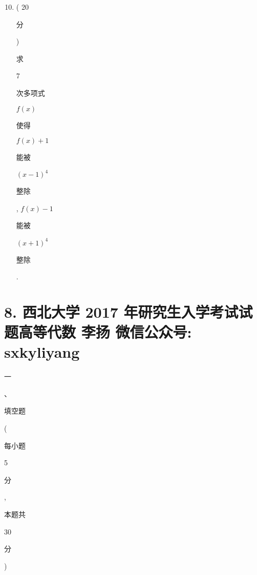 \documentclass[10pt]{article}
\begin{document}
\begin{enumerate}
  \setcounter{enumi}{9}
  \item ( 20 \begin{CJK}{UTF8}{mj}分\end{CJK}) \begin{CJK}{UTF8}{mj}求\end{CJK} 7 \begin{CJK}{UTF8}{mj}次多项式\end{CJK} $f(x)$ \begin{CJK}{UTF8}{mj}使得\end{CJK} $f(x)+1$ \begin{CJK}{UTF8}{mj}能被\end{CJK} $(x-1)^{4}$ \begin{CJK}{UTF8}{mj}整除\end{CJK}, $f(x)-1$ \begin{CJK}{UTF8}{mj}能被\end{CJK} $(x+1)^{4}$ \begin{CJK}{UTF8}{mj}整除\end{CJK}.
\end{enumerate}
\section{8. 西北大学 2017 年研究生入学考试试题高等代数 
 李扬 
 微信公众号: sxkyliyang}
\begin{CJK}{UTF8}{mj}一\end{CJK}、\begin{CJK}{UTF8}{mj}填空题\end{CJK} (\begin{CJK}{UTF8}{mj}每小题\end{CJK} 5 \begin{CJK}{UTF8}{mj}分\end{CJK}, \begin{CJK}{UTF8}{mj}本题共\end{CJK} 30 \begin{CJK}{UTF8}{mj}分\end{CJK})
\end{document}
